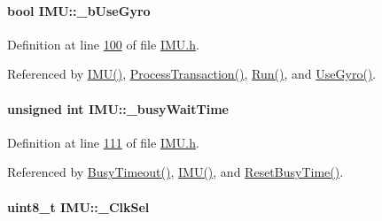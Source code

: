 \hypertarget{class_i_m_u_a0cee90ebd5d0b57fa5ad3890c65108e2}{
\paragraph[{\_\-bUseGyro}]{\setlength{\rightskip}{0pt plus 5cm}bool {\bf IMU::\_\-bUseGyro}}\hfill}
\label{class_i_m_u_a0cee90ebd5d0b57fa5ad3890c65108e2}


Definition at line \hyperlink{_i_m_u_8h_source_l00100}{100} of file \hyperlink{_i_m_u_8h_source}{IMU.h}.



Referenced by \hyperlink{_i_m_u_8cpp_source_l00020}{IMU()}, \hyperlink{_i_m_u_8cpp_source_l00348}{ProcessTransaction()}, \hyperlink{_i_m_u_8cpp_source_l00290}{Run()}, and \hyperlink{_i_m_u_8h_source_l00137}{UseGyro()}.

\hypertarget{class_i_m_u_adce31ce2a3317918d73b47e94a2d9227}{
\paragraph[{\_\-busyWaitTime}]{\setlength{\rightskip}{0pt plus 5cm}unsigned int {\bf IMU::\_\-busyWaitTime}}\hfill}
\label{class_i_m_u_adce31ce2a3317918d73b47e94a2d9227}


Definition at line \hyperlink{_i_m_u_8h_source_l00111}{111} of file \hyperlink{_i_m_u_8h_source}{IMU.h}.



Referenced by \hyperlink{_i_m_u_8h_source_l00195}{BusyTimeout()}, \hyperlink{_i_m_u_8cpp_source_l00020}{IMU()}, and \hyperlink{_i_m_u_8h_source_l00190}{ResetBusyTime()}.

\hypertarget{class_i_m_u_a4dbeaf17fd1ae9b41b5c3fe61706e5f1}{
\paragraph[{\_\-ClkSel}]{\setlength{\rightskip}{0pt plus 5cm}uint8\_\-t {\bf IMU::\_\-ClkSel}}\hfill}
\label{class_i_m_u_a4dbeaf17fd1ae9b41b5c3fe61706e5f1}


